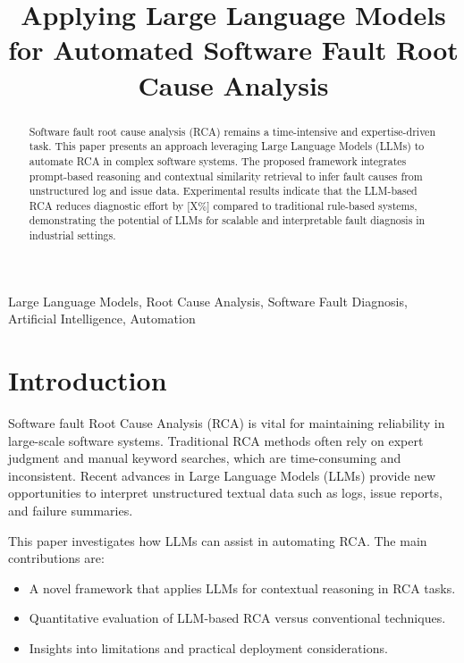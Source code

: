 \documentclass[conference]{IEEEtran}
\begin{document}
\title{Applying Large Language Models for Automated Software Fault Root Cause Analysis}

\author{
}

\maketitle

\begin{abstract}
Software fault root cause analysis (RCA) remains a time-intensive and expertise-driven task. This paper presents an approach leveraging Large Language Models (LLMs) to automate RCA in complex software systems. The proposed framework integrates prompt-based reasoning and contextual similarity retrieval to infer fault causes from unstructured log and issue data. Experimental results indicate that the LLM-based RCA reduces diagnostic effort by [X\%] compared to traditional rule-based systems, demonstrating the potential of LLMs for scalable and interpretable fault diagnosis in industrial settings.
\end{abstract}

\begin{IEEEkeywords}
Large Language Models, Root Cause Analysis, Software Fault Diagnosis, Artificial Intelligence, Automation
\end{IEEEkeywords}

\section{Introduction}
Software fault Root Cause Analysis (RCA) is vital for maintaining reliability in large-scale software systems. Traditional RCA methods often rely on expert judgment and manual keyword searches, which are time-consuming and inconsistent. Recent advances in Large Language Models (LLMs) provide new opportunities to interpret unstructured textual data such as logs, issue reports, and failure summaries.

This paper investigates how LLMs can assist in automating RCA. The main contributions are:
\begin{itemize}
    \item A novel framework that applies LLMs for contextual reasoning in RCA tasks.
    \item Quantitative evaluation of LLM-based RCA versus conventional techniques.
    \item Insights into limitations and practical deployment considerations.
\end{itemize}
\end{document}
